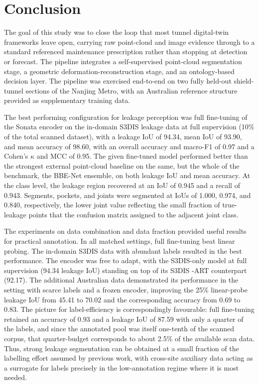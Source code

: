 \documentclass[preprint,12pt,authoryear]{elsarticle}
\begin{document}
\section{Conclusion}\label{conclusion}

The goal of this study was to close the loop that most tunnel
digital-twin frameworks leave open, carrying raw point-cloud and image
evidence through to a standard referenced maintenance prescription
rather than stopping at detection or forecast. The pipeline integrates a
self-supervised point-cloud segmentation stage, a geometric
deformation-reconstruction stage, and an ontology-based decision layer.
The pipeline was exercised end-to-end on two fully held-out
shield-tunnel sections of the Nanjing Metro, with an Australian
reference structure provided as supplementary training data.

The best performing configuration for leakage perception was full
fine-tuning of the Sonata encoder on the in-domain S3DIS leakage data at
full supervision (10\% of the total scanned dataset), with a leakage IoU
of 94.34, mean IoU of 93.90, and mean accuracy of 98.60, with an overall
accuracy and macro-F1 of 0.97 and a Cohen's $\kappa$ and MCC of 0.95. The given
fine-tuned model performed better than the strongest external
point-cloud baseline on the same, but the whole of the benchmark, the
BBE-Net ensemble, on both leakage IoU and mean accuracy. At the class
level, the leakage region recovered at an IoU of 0.945 and a recall of
0.943. Segments, pockets, and joints were segmented at IoUs of 1.000,
0.974, and 0.840, respectively, the lower joint value reflecting the
small fraction of true-leakage points that the confusion matrix assigned
to the adjacent joint class.

The experiments on data combination and data fraction provided useful
results for practical annotation. In all matched settings, full
fine-tuning beat linear probing. The in-domain S3DIS data with abundant
labels resulted in the best performance. The encoder was free to adapt,
with the S3DIS-only model at full supervision (94.34 leakage IoU)
standing on top of its S3DIS -ART counterpart (92.17). The additional
Australian data demonstrated its performance in the setting with scarce
labels and a frozen encoder, improving the 25\% linear-probe leakage IoU
from 45.41 to 70.02 and the corresponding accuracy from 0.69 to 0.83.
The picture for label-efficiency is correspondingly favourable: full
fine-tuning retained an accuracy of 0.93 and a leakage IoU of 87.59 with
only a quarter of the labels, and since the annotated pool was itself
one-tenth of the scanned corpus, that quarter-budget corresponds to
about 2.5\% of the available scan data. Thus, strong leakage
segmentation can be obtained at a small fraction of the labelling effort
assumed by previous work, with cross-site auxiliary data acting as a
surrogate for labels precisely in the low-annotation regime where it is
most needed.
\end{document}

